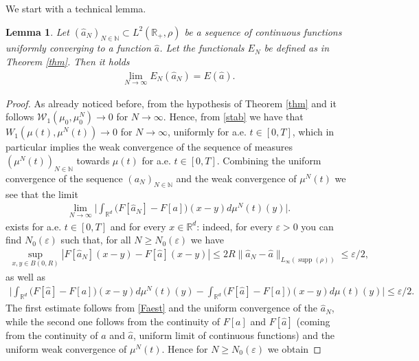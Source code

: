 \documentclass[A4paper,11pt]{article}
\newtheorem{lemma}[theorem]{Lemma}
\theoremstyle{definition}
\newcommand{\N}{\mathbb{N}}
\newcommand{\R}{\mathbb{R}}
\newcommand{\W}{\mathcal{W}}
\DeclareMathOperator{\supp}{supp}
\begin{document}
We start with a technical lemma.

\begin{lemma}\label{lemma-semicontinuous-1}
	Let $(\widehat a_N)_{N \in \N}\subset L^2(\R_+,\rho)$ be a sequence of continuous functions uniformly converging to a function $\widehat a$. %
	Let the functionals $E_N$ be defined as in Theorem \ref{thm}. Then it holds
	\begin{align*}
		\lim_{N\rightarrow\infty}E_{N}(\widehat a_{N})= E(\widehat a).
	\end{align*}
\end{lemma}

\begin{proof}
	As already noticed before, from the hypothesis of Theorem \ref{thm} and \cite[Lemma 3.3]{fornahuetter} it follows $\W_1(\mu_0,\mu^N_0) \rightarrow 0$ for $N \rightarrow \infty$. Hence, from \eqref{stab} we have that $W_1(\mu(t),\mu^N(t))\rightarrow 0$ for $N\rightarrow\infty$, uniformly for a.e. $t \in [0,T]$, which in particular implies the weak convergence of the sequence of measures $(\mu^N(t))_{N \in \N}$ towards $\mu(t)$ for a.e. $t\in [0,T]$. Combining the uniform convergence of the sequence $(a_{N})_{N \in \N}$ and the weak convergence of
	$\mu^{N}(t)$ we see that the limit
	\begin{align*}
		\lim_{N\rightarrow\infty}
			\Biggl|\int_{\R^d}\bigl(F[\widehat a_{N}]-F[a]\bigr)(x-y)d\mu^{N}(t)(y)\Biggr|.
	\end{align*}
	exists for a.e. $t \in [0,T]$ and for every $x \in \R^d$: indeed, for every $\varepsilon > 0$ you can find $N_0(\varepsilon)$ such that, for all $N \geq N_0(\varepsilon)$ we have
	\begin{align*}
		\sup_{x,y \in B(0,R)}|F[\widehat a_{N}](x-y)-F[\widehat a](x-y)|
			\leq 2R \|\widehat a_{N}-\widehat a\|_{L_\infty(\supp(\rho))}\leq\varepsilon/2,
	\end{align*}
	as well as
	\begin{align*}
		\biggl|\int_{\R^d}\bigl(F[\widehat a]-F[a]\bigr)(x-y)d\mu^{N}(t)(y)
			-\int_{\R^d}\bigl(F[\widehat a]-F[a]\bigr)(x-y)d\mu(t)(y)\biggr|\leq\varepsilon/2.
	\end{align*}
	The first estimate follows from \eqref{Faest} and the uniform convergence of the $\widehat a_{N}$, while the second one follows from the continuity of
	$F[a]$ and $F[\widehat a]$ (coming from the continuity of $a$ and $\widehat a$, uniform limit of continuous functions) and the uniform weak convergence of $\mu^{N}(t)$. Hence for $N\geq N_0(\varepsilon)$ we obtain

\end{proof}
\end{document}
